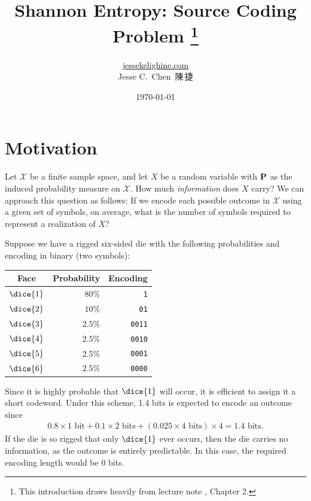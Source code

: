 \documentclass[a4paper]{article}
\title{Shannon Entropy: Source Coding Problem%
\thanks{This introduction draws heavily from lecture note \textcite{duchi-2023}, Chapter 2.}%
}
\author{\href{https://jessekelighine.com}{jessekelighine.com}\\Jesse C.\ Chen\ 陳\,捷}
\date{\today}
\begin{document}
\maketitle

\section{Motivation}


Let $\mathcal{X}$ be a finite sample space,
and let $X$ be a random variable with $\operatorname{\text{\textrm{\upshape\textbf{P}}}}$ as the induced probability measure on $\mathcal{X}$.
How much \emph{information} does $X$ carry?
We can approach this question as follows:
If we encode each possible outcome in $\mathcal{X}$ using a given set of symbols,
on average, what is the number of symbols required to represent a realization of $X$?

\begin{example}\label{eg:dice}
    Suppose we have a rigged six-sided die with the following probabilities and encoding in binary (two symbols):
    \begin{center}
        \begin{tabular}{crr}
            \toprule
            Face & Probability & Encoding \\
            \midrule
            $\dice{1}$ & $80\%$  & \texttt{1} \\
            $\dice{2}$ & $10\%$  & \texttt{01} \\
            $\dice{3}$ & $2.5\%$ & \texttt{0011} \\
            $\dice{4}$ & $2.5\%$ & \texttt{0010} \\
            $\dice{5}$ & $2.5\%$ & \texttt{0001} \\
            $\dice{6}$ & $2.5\%$ & \texttt{0000} \\
            \bottomrule
        \end{tabular}
    \end{center}
    Since it is highly probable that $\dice{1}$ will occur,
	it is efficient to assign it a short codeword.
	Under this scheme, 1.4 bits is expected to encode an outcome since
	\begin{align*}
		0.8 \times 1\text{ bit} + 0.1 \times 2\text{ bits} + (0.025 \times 4\text{ bits})\times 4 = 1.4 \text{ bits.}
	\end{align*}
    If the die is so rigged that only $\dice{1}$ ever occurs,
	then the die carries no information,
	as the outcome is entirely predictable.
	In this case, the required encoding length would be $0$ bits.
\end{example}
\end{document}
